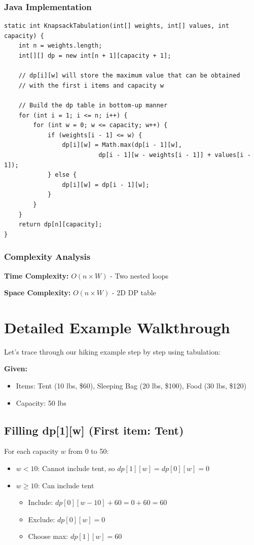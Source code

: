 \documentclass[12pt,a4paper]{article}
\begin{document}
\subsubsection{Java Implementation}
\begin{lstlisting}[caption=Tabulation Solution]
static int KnapsackTabulation(int[] weights, int[] values, int capacity) {
    int n = weights.length;
    int[][] dp = new int[n + 1][capacity + 1];

    // dp[i][w] will store the maximum value that can be obtained 
    // with the first i items and capacity w

    // Build the dp table in bottom-up manner
    for (int i = 1; i <= n; i++) {
        for (int w = 0; w <= capacity; w++) {
            if (weights[i - 1] <= w) {
                dp[i][w] = Math.max(dp[i - 1][w], 
                          dp[i - 1][w - weights[i - 1]] + values[i - 1]); 
            } else {
                dp[i][w] = dp[i - 1][w];
            }
        }
    }
    return dp[n][capacity];
}
\end{lstlisting}

\subsubsection{Complexity Analysis}
\textbf{Time Complexity:} $O(n \times W)$ - Two nested loops

\textbf{Space Complexity:} $O(n \times W)$ - 2D DP table

\section{Detailed Example Walkthrough}

Let's trace through our hiking example step by step using tabulation:

\textbf{Given:}
\begin{itemize}
\item Items: Tent (10 lbs, \$60), Sleeping Bag (20 lbs, \$100), Food (30 lbs, \$120)
\item Capacity: 50 lbs
\end{itemize}

\subsection{Filling dp[1][w] (First item: Tent)}
For each capacity $w$ from 0 to 50:
\begin{itemize}
\item $w < 10$: Cannot include tent, so $dp[1][w] = dp[0][w] = 0$
\item $w \geq 10$: Can include tent
    \begin{itemize}
    \item Include: $dp[0][w-10] + 60 = 0 + 60 = 60$
    \item Exclude: $dp[0][w] = 0$
    \item Choose max: $dp[1][w] = 60$
    \end{itemize}
\end{itemize}
\end{document}
